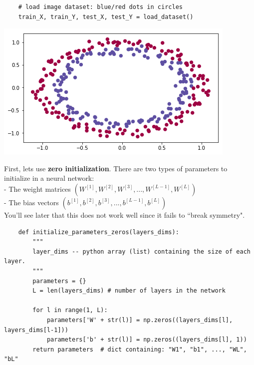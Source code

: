 \documentclass[11pt, a4paper]{article}
\begin{document}
\begin{spacing}{1.1}
\begin{minipage}[c]{10.5cm}
\begin{lstlisting}
	# load image dataset: blue/red dots in circles
	train_X, train_Y, test_X, test_Y = load_dataset() \end{lstlisting} \vspace*{3mm}
	\end{minipage}
	\begin{minipage}[c]{8cm}
	\hspace*{1mm} \includegraphics[scale=0.55]{planar_data} \\
	\end{minipage}
	First, lets use \textbf{zero initialization}. There are two types of parameters to initialize in a neural network: \vspace*{1mm}\\
	\hspace*{3mm} - The weight matrices $(W^{[1]}, W^{[2]}, W^{[3]}, ..., W^{[L-1]}, W^{[L]})$ \\
	\hspace*{3mm} - The bias vectors $(b^{[1]}, b^{[2]}, b^{[3]}, ..., b^{[L-1]}, b^{[L]})$ \vspace*{1mm}\\
	You'll see later that this does not work well since it fails to ``break symmetry".
	\begin{lstlisting}
	def initialize_parameters_zeros(layers_dims):
		"""
		layer_dims -- python array (list) containing the size of each layer.
		"""
		parameters = {}
		L = len(layers_dims) # number of layers in the network
		
		for l in range(1, L):
			parameters['W' + str(l)] = np.zeros((layers_dims[l], layers_dims[l-1]))
			parameters['b' + str(l)] = np.zeros((layers_dims[l], 1))
		return parameters  # dict containing: "W1", "b1", ..., "WL", "bL"
	

\end{lstlisting}
\end{spacing}
\end{document}
